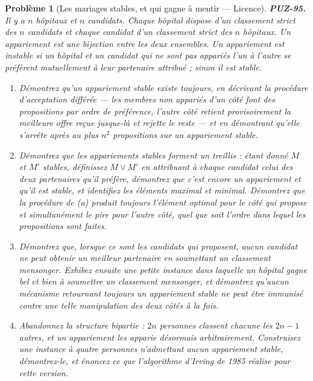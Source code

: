 \documentclass[11pt]{article}
\newtheorem{problem}{Problème}
\begin{document}
\begin{problem}[{Les mariages stables, et qui gagne à mentir --- Licence}]
\textbf{PUZ-95.} Il y a $ n $ hôpitaux et $ n $ candidats. Chaque hôpital dispose
d'un classement strict des $ n $ candidats et chaque candidat d'un classement strict des
$ n $ hôpitaux. Un \textit{appariement} est une bijection entre les deux ensembles. Un
appariement est \textit{instable} si un hôpital et un candidat qui ne sont pas appariés
l'un à l'autre se préfèrent mutuellement à leur partenaire attribué ; sinon il est
\textit{stable}.
\begin{enumerate}
\item[(a)] Démontrez qu'un appariement stable existe toujours, en décrivant la procédure
d'acceptation différée --- les membres non appariés d'un côté font des propositions par ordre
de préférence, l'autre côté retient provisoirement la meilleure offre reçue jusque-là et
rejette le reste --- et en démontrant qu'elle s'arrête après au plus $ n^{2} $ propositions
sur un appariement stable.
\item[(b)] Démontrez que les appariements stables forment un treillis : étant donné $ M $ et
$ M' $ stables, définissez $ M \vee M' $ en attribuant à chaque candidat celui des deux
partenaires qu'il préfère, démontrez que c'est encore un appariement et qu'il est stable, et
identifiez les éléments maximal et minimal. Démontrez que la procédure de (a) produit
toujours l'élément optimal pour le côté qui propose et simultanément le pire pour l'autre
côté, quel que soit l'ordre dans lequel les propositions sont faites.
\item[(c)] Démontrez que, lorsque ce sont les candidats qui proposent, aucun candidat ne peut
obtenir un meilleur partenaire en soumettant un classement mensonger. Exhibez ensuite une
petite instance dans laquelle un hôpital gagne bel et bien à soumettre un classement
mensonger, et démontrez qu'aucun mécanisme retournant toujours un appariement stable ne peut
être immunisé contre une telle manipulation des deux côtés à la fois.
\item[(d)] Abandonnez la structure bipartie : $ 2n $ personnes classent chacune les $ 2n - 1 $
autres, et un appariement les apparie désormais arbitrairement. Construisez une instance à
quatre personnes n'admettant aucun appariement stable, démontrez-le, et énoncez ce que
l'algorithme d'Irving de 1985 réalise pour cette version.
\end{enumerate}

\end{problem}
\end{document}
